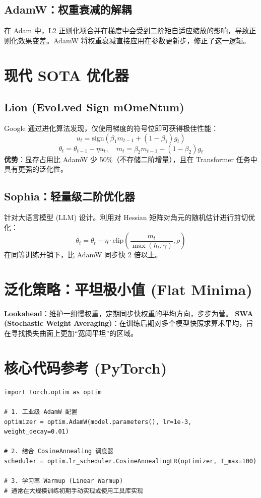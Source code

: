 \documentclass[12pt, a4paper]{article}
\begin{document}
\subsection{AdamW：权重衰减的解耦}
在 Adam 中，L2 正则化项合并在梯度中会受到二阶矩自适应缩放的影响，导致正则化效果变差。AdamW 将权重衰减直接应用在参数更新步，修正了这一逻辑。

\section{现代 SOTA 优化器}

\subsection{Lion (EvoLved Sign mOmeNtum)}
Google 通过进化算法发现，仅使用梯度的符号位即可获得极佳性能：
$$ u_t = \text{sign}(\beta_1 m_{t-1} + (1-\beta_1)g_t) $$
$$ \theta_t = \theta_{t-1} - \eta u_t, \quad m_t = \beta_2 m_{t-1} + (1-\beta_2)g_t $$
\textbf{优势}：显存占用比 AdamW 少 50\%（不存储二阶增量），且在 Transformer 任务中具有更强的泛化性。

\subsection{Sophia：轻量级二阶优化器}
针对大语言模型 (LLM) 设计。利用对 Hessian 矩阵对角元的随机估计进行剪切优化：
$$ \theta_t = \theta_t - \eta \cdot \text{clip}\left(\frac{m_t}{\max(h_t, \gamma)}, \rho\right) $$
在同等训练开销下，比 AdamW 同步快 2 倍以上。

\section{泛化策略：平坦极小值 (Flat Minima)}
\textbf{Lookahead}：维护一组慢权重，定期同步快权重的平均方向，步步为营。
\textbf{SWA (Stochastic Weight Averaging)}：在训练后期对多个模型快照求算术平均，旨在寻找损失曲面上更加“宽阔平坦”的区域。

\section{核心代码参考 (PyTorch)}
\begin{lstlisting}
import torch.optim as optim

# 1. 工业级 AdamW 配置
optimizer = optim.AdamW(model.parameters(), lr=1e-3, weight_decay=0.01)

# 2. 结合 CosineAnnealing 调度器
scheduler = optim.lr_scheduler.CosineAnnealingLR(optimizer, T_max=100)

# 3. 学习率 Warmup (Linear Warmup)
# 通常在大规模训练初期手动实现或使用工具库实现
\end{lstlisting}
\end{document}
